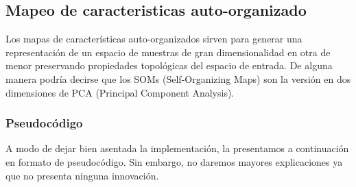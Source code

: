 \documentclass[informe.tex]{subfiles}
\begin{document}
    \subsection{Mapeo de caracteristicas auto-organizado}
	Los mapas de características auto-organizados sirven para generar una representación de un espacio de muestras de gran dimensionalidad en otra de menor preservando propiedades topológicas del espacio de entrada. De alguna manera podr\'ia decirse que los SOMs (Self-Organizing Maps) son la versión en dos dimensiones de PCA (Principal Component Analysis).
	
	\newpage
	\subsubsection{Pseudoc\'odigo}
	
	A modo de dejar bien asentada la implementación, la presentamos a continuación en formato de pseudocódigo. Sin embargo, no daremos mayores explicaciones ya que no presenta ninguna innovación.
	
	\vspace{10pt}
	
\end{document}
